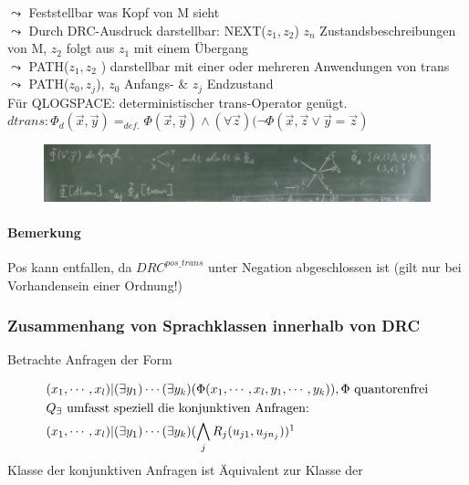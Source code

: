 \documentclass[12pt, a4paper]{article}
\begin{document}
$\leadsto$ Feststellbar was Kopf von M sieht \\
$\leadsto$ Durch DRC-Ausdruck darstellbar: NEXT($z_1, z_2$) $z_n$ Zustandsbeschreibungen von M, $z_2$ folgt aus $z_1$ mit einem Übergang\\
$\leadsto$ PATH($z_1, z_2$ ) darstellbar mit einer oder mehreren Anwendungen von trans \\
$\leadsto$ PATH($z_0, z_j$), $z_0$ Anfangs- \& $z_j$ Endzustand \\

Für QLOGSPACE: deterministischer trans-Operator genügt. \\
$dtrans: \Phi_d(\overrightarrow{x}, \overrightarrow{y}) =_{def.} \Phi(\overrightarrow{x}, \overrightarrow{y}) \wedge (\forall \overrightarrow{z})(\lnot \Phi(\overrightarrow{x}, \overrightarrow{z} \vee \overrightarrow{y} = \overrightarrow{z})$

\begin{figure}[h!]
\centering
\includegraphics[width=0.7\linewidth]{img/img27}
\caption{}
\label{fig:img27}
\end{figure}


\paragraph{Bemerkung}

Pos kann entfallen, da $DRC^{pos\_trans}$ unter Negation abgeschlossen ist (gilt nur bei Vorhandensein einer Ordnung!)

\subsubsection*{Zusammenhang von Sprachklassen innerhalb von DRC}
Betrachte Anfragen der Form

\begin{align*}
&(x_1, \cdots, x_l) | (\exists y_1)\cdots(\exists y_k)(\Phi(x_1, \cdots, x_l, y_1, \cdots, y_k)), \Phi \text{ quantorenfrei} \\
& Q_\exists \text{ umfasst speziell die konjunktiven Anfragen:} \\
&(x_1, \cdots, x_l) | (\exists y_1)\cdots(\exists y_k)(\bigwedge_j R_j(u_{j1}, u_{jn_j}))\footnotemark
\end{align*}
Klasse der konjunktiven Anfragen ist Äquivalent zur Klasse der
\end{document}
